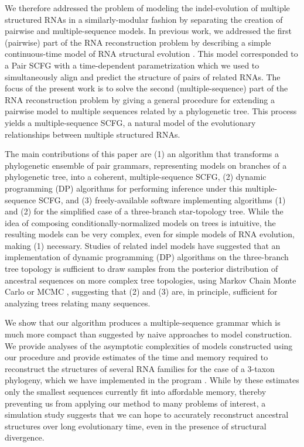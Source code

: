 \documentclass[10pt]{article}
\begin{document}
We therefore addressed the problem of modeling the indel-evolution of
multiple structured RNAs in a similarly-modular fashion by separating
the creation of pairwise and multiple-sequence models.  In previous
work, we addressed the first (pairwise) part of the RNA reconstruction
problem by describing a simple continuous-time model of RNA structural
evolution \cite{Holmes2004}.  This model corresponded to a Pair SCFG
with a time-dependent parametrization which we used to
simultaneously align and predict the structure of
pairs of related RNAs.  The focus of the present work is to solve the second
(multiple-sequence) part of the RNA reconstruction problem by giving a
general procedure for extending a pairwise model to multiple
sequences related by a phylogenetic tree.  This process
yields a multiple-sequence SCFG, a natural model of the evolutionary
relationships between multiple structured RNAs.

The main contributions of this paper are
(1) an algorithm that transforms a phylogenetic ensemble of pair
grammars, representing models on branches of a phylogenetic tree,
into a coherent, multiple-sequence SCFG,
(2) dynamic programming (DP) algorithms for performing inference under
this multiple-sequence SCFG, and
(3) freely-available software implementing algorithms (1) and (2) for
the simplified case of a three-branch star-topology tree.
While the idea of composing conditionally-normalized models on trees
is intuitive, the resulting models can be very complex, even for
simple models of RNA evolution, making (1) necessary.
Studies of related indel models have suggested that an implementation
of dynamic programming (DP) algorithms on the three-branch tree topology is sufficient to
draw samples from the posterior distribution of ancestral sequences on
more complex tree topologies, using Markov Chain Monte Carlo or MCMC
\cite{HolmesBruno2001,JensenHein2002,RedelingsSuchard2005},
suggesting that (2) and (3) are, in principle, sufficient for analyzing trees
relating many sequences.

We show that our algorithm produces a multiple-sequence grammar which is
much more compact than suggested by naive approaches to model
construction.  We provide analyses of the asymptotic complexities of
models constructed using our procedure and provide estimates of the
time and memory required to reconstruct the structures of several RNA
families for the case of a 3-taxon phylogeny, which we have
implemented in the program \indiegram. While by these estimates only
the smallest sequences currently fit into affordable memory, thereby
preventing us from applying our method to many problems of interest,
a simulation study suggests that we can hope to accurately reconstruct
ancestral structures over long evolutionary time, even in the presence
of structural divergence.
\end{document}
